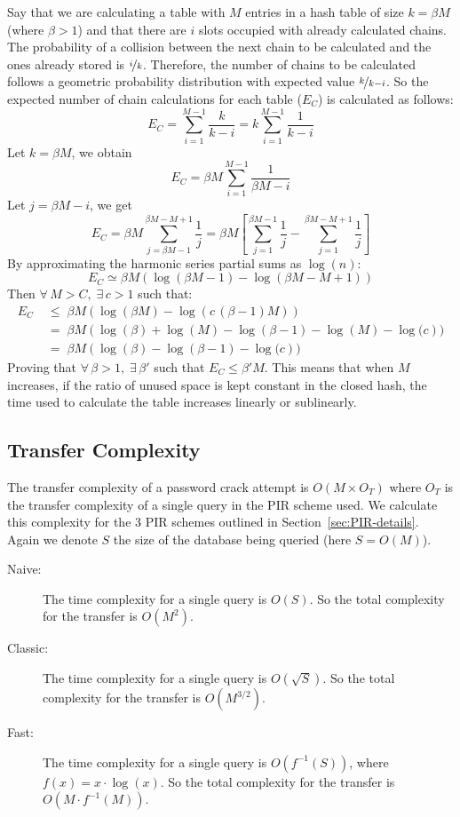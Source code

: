 \documentclass{llncs}
\begin{document}
Say that we are calculating a table with $M$ entries in a hash
table of size $k=\beta M$ (where $\beta>1$) and that there are $i$
slots occupied with already calculated chains. The probability of
a collision between the next chain to be calculated and the ones already
stored is $\nicefrac{i}{k}$. Therefore, the number of chains to be
calculated follows a geometric probability distribution with expected
value $\nicefrac{k}{k-i}$. So the expected number of chain calculations
for each table ($E_{C}$) is calculated as follows:
\[
E_{C} = \sum_{i=1}^{M-1}\frac{k}{k-i}=k\sum_{i=1}^{M-1}\frac{1}{k-i}
\]
Let $k=\beta M$, we obtain
\[
E_{C} = \beta M\sum_{i=1}^{M-1}\frac{1}{\beta M-i}
\]
Let $j=\beta M-i$, we get
\[
E_{C} = \beta M\sum_{j=\beta M-1}^{\beta M-M+1}\frac{1}{j}=\beta M\left[\sum_{j=1}^{\beta M-1}\frac{1}{j}-\sum_{j=1}^{\beta M-M+1}\frac{1}{j}\right]
\]
By approximating the harmonic series partial sums as $\log(n)$:
$$
E_{C} \simeq \beta M\left(\log(\beta M-1) - \log(\beta M-M+1)\right) 
$$
Then $\forall \, M > C, \; \exists \, c>1$ such that:
\begin{align*}
E_{C} \; & \le \; \beta M\left(\log(\beta M) - \log(c\,(\beta-1)M)\right)  \\
 &= \; \beta M\left(\log(\beta)+\log(M)-\log(\beta-1)-\log(M)-\log(c\right)) \\
 &= \; \beta M\left(\log(\beta)-\log(\beta-1)-\log(c\right))
\end{align*}
Proving that $\forall \, \beta > 1, \; \exists \, \beta'$ 
such that $E_{C} \leq \beta'M$. 
This means that when $M$ increases, if the ratio of unused space
is kept constant in the closed hash, the time used to calculate the
table increases linearly or sublinearly.



\subsection{Transfer Complexity}

The transfer complexity of a password crack attempt is $O(M\times O_{T})$
where $O_{T}$ is the transfer complexity of a single query in the
PIR scheme used. We calculate this complexity for the 3 PIR schemes
outlined in Section~\ref{sec:PIR-details}.
Again we denote $S$ the size of the database being queried (here $S = O(M)$).
\begin{description}
\item [{Naive:}] The time complexity for a single query is $O(S)$. 
So the total complexity for the transfer is $O(M^{2})$.
\item [{Classic:}] The time complexity for a single query is $O(\sqrt{S})$.
So the total complexity for the transfer is $O(M^{3/2})$.
\item [{Fast:}] The time complexity for a single query is $O(f^{-1}(S))$,
where $f(x) = x \cdot \log(x)$. So the total complexity for the
transfer is $O(M \cdot f^{-1}(M))$.
\end{description}
\end{document}
